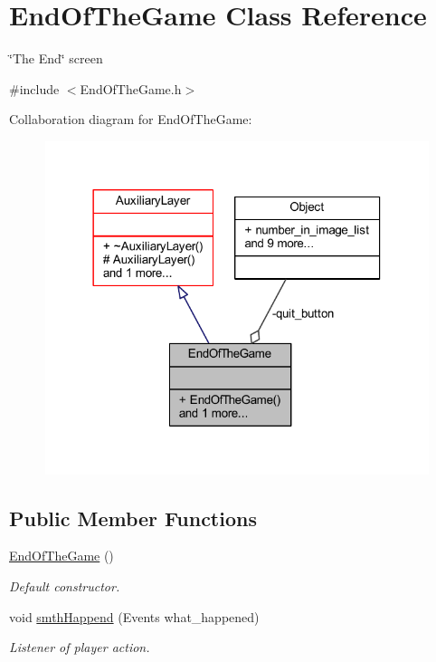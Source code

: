 \hypertarget{class_end_of_the_game}{}\section{End\+Of\+The\+Game Class Reference}
\label{class_end_of_the_game}


\char`\"{}\+The End\char`\"{} screen  




{\ttfamily \#include $<$End\+Of\+The\+Game.\+h$>$}



Collaboration diagram for End\+Of\+The\+Game\+:\nopagebreak
\begin{figure}[H]
\begin{center}
\leavevmode
\includegraphics[width=318pt]{class_end_of_the_game__coll__graph}
\end{center}
\end{figure}
\subsection*{Public Member Functions}
\begin{DoxyCompactItemize}
\item 
\mbox{\label{class_end_of_the_game_a27eaa843d569afd8565ed6369ea82e4f}} 
\hyperlink{class_end_of_the_game_a27eaa843d569afd8565ed6369ea82e4f}{End\+Of\+The\+Game} ()
\begin{DoxyCompactList}\small\item\em Default constructor. \end{DoxyCompactList}\item 
void \hyperlink{class_end_of_the_game_a88ac00a6aaa5193c7642d9ea2c6be688}{smth\+Happend} (Events what\+\_\+happened)
\begin{DoxyCompactList}\small\item\em Listener of player action. \end{DoxyCompactList}\end{DoxyCompactItemize}
